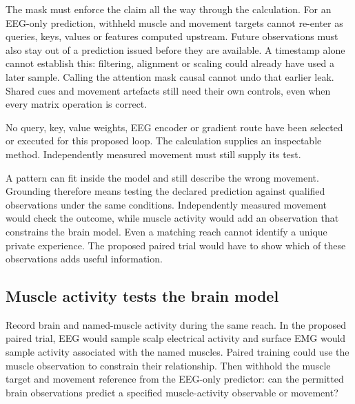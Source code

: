The mask must enforce the claim all the way through the calculation. For an
EEG-only prediction, withheld muscle and movement targets cannot re-enter as
queries, keys, values or features computed upstream. Future observations must
also stay out of a prediction issued before they are available. A timestamp
alone cannot establish this: filtering, alignment or scaling could already
have used a later sample. Calling the attention mask causal cannot undo that
earlier leak. Shared cues and movement artefacts still need their own controls,
even when every matrix operation is correct.

No query, key, value weights, EEG encoder or gradient route have been selected
or executed for this proposed loop. The calculation supplies an inspectable
method. Independently measured movement must still supply its test.

A pattern can fit inside the model and still describe the wrong movement.
Grounding therefore means testing the declared prediction against qualified
observations under the same conditions. Independently measured movement would
check the outcome, while muscle activity would add an observation that
constrains the brain model. Even a matching reach cannot identify a unique
private experience. The proposed paired trial would have to show which of
these observations adds useful information.

\subsection{Muscle activity tests the brain model}
Record brain and named-muscle activity during the same reach. In the proposed
paired trial, EEG would sample scalp electrical activity and surface EMG would
sample activity associated with the named muscles. Paired training could use
the muscle observation to constrain their relationship. Then withhold the
muscle target and movement reference from the EEG-only predictor: can the
permitted brain observations predict a specified muscle-activity observable
or movement?

